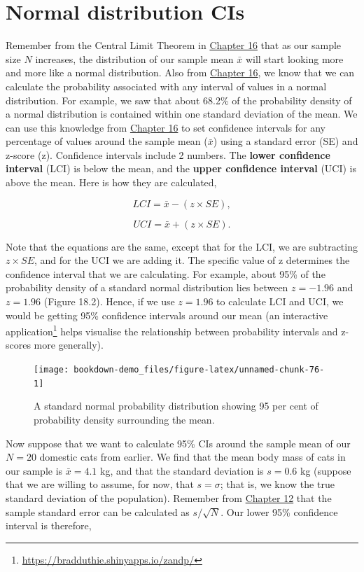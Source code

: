 \documentclass[
  openany]{krantz}
\begin{document}
\hypertarget{normal-distribution-cis}{%
\section{Normal distribution CIs}\label{normal-distribution-cis}}

Remember from the Central Limit Theorem in \protect\hyperlink{Chapter_16}{Chapter 16} that as our sample size \(N\) increases, the distribution of our sample mean \(\bar{x}\) will start looking more and more like a normal distribution.
Also from \protect\hyperlink{Chapter_16}{Chapter 16}, we know that we can calculate the probability associated with any interval of values in a normal distribution.
For example, we saw that about 68.2\% of the probability density of a normal distribution is contained within one standard deviation of the mean.
We can use this knowledge from \protect\hyperlink{Chapter_16}{Chapter 16} to set confidence intervals for any percentage of values around the sample mean (\(\bar{x}\)) using a standard error (SE) and z-score (z).
Confidence intervals include 2 numbers.
The \textbf{lower confidence interval} (LCI) is below the mean, and the \textbf{upper confidence interval} (UCI) is above the mean.
Here is how they are calculated,

\[LCI = \bar{x} - (z \times SE),\]

\[UCI = \bar{x} + (z \times SE).\]

Note that the equations are the same, except that for the LCI, we are subtracting \(z \times SE\), and for the UCI we are adding it.
The specific value of z determines the confidence interval that we are calculating.
For example, about 95\% of the probability density of a standard normal distribution lies between \(z = -1.96\) and \(z = 1.96\) (Figure 18.2).
Hence, if we use \(z = 1.96\) to calculate LCI and UCI, we would be getting 95\% confidence intervals around our mean (an interactive application\footnote{\url{https://bradduthie.shinyapps.io/zandp/}} helps visualise the relationship between probability intervals and z-scores more generally).

\begin{figure}
\texttt{[image: bookdown-demo\_files/figure-latex/unnamed-chunk-76-1]} \caption{A standard normal probability distribution showing 95 per cent of probability density surrounding the mean.}\label{fig:unnamed-chunk-76}
\end{figure}

Now suppose that we want to calculate 95\% CIs around the sample mean of our \(N = 20\) domestic cats from earlier.
We find that the mean body mass of cats in our sample is \(\bar{x} = 4.1\) kg, and that the standard deviation is \(s = 0.6\) kg (suppose that we are willing to assume, for now, that \(s = \sigma\); that is, we know the true standard deviation of the population).
Remember from \protect\hyperlink{Chapter_12}{Chapter 12} that the sample standard error can be calculated as \(s / \sqrt{N}\).
Our lower 95\% confidence interval is therefore,
\end{document}
